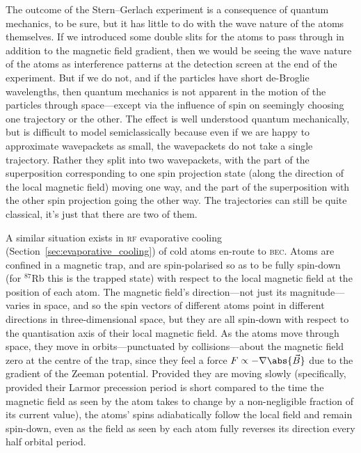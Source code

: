 The outcome of the Stern--Gerlach experiment is a consequence of quantum mechanics, to be sure, but it has little to do with the wave nature of the atoms themselves. If we introduced some double slits for the atoms to pass through in addition to the magnetic field gradient, then we would be seeing the wave nature of the atoms as interference patterns at the detection screen at the end of the experiment. But if we do not, and if the particles have short de-Broglie wavelengths, then quantum mechanics is not apparent in the motion of the particles through space---except via the influence of spin on seemingly choosing one trajectory or the other. The effect is well understood quantum mechanically, but is difficult to model semiclassically because even if we are happy to approximate wavepackets as small, the wavepackets do not take a single trajectory. Rather they split into two wavepackets, with the part of the superposition corresponding to one spin projection state (along the direction of the local magnetic field) moving one way, and the part of the superposition with the other spin projection going the other way. The trajectories can still be quite classical, it's just that there are two of them.

A similar situation exists in \textsc{rf} evaporative cooling (Section~\ref{sec:evaporative_cooling}) of cold atoms en-route to \textsc{bec}. Atoms are confined in a magnetic trap, and are spin-polarised so as to be fully spin-down (for $^{87}$Rb this is the trapped state) with respect to the local magnetic field at the position of each atom. The magnetic field's direction---not just  its magnitude---varies in space, and so the spin vectors of different atoms point in different directions in three-dimensional space, but they are all spin-down with respect to the quantisation axis of their local magnetic field. As the atoms move through space, they move in orbits---punctuated by collisions---about the magnetic field zero at the centre of the trap, since they feel a force $F\propto-\nabla\abs{\vec B}$ due to the gradient of the Zeeman potential. Provided they are moving slowly (specifically, provided their Larmor precession period is short compared to the time the magnetic field as seen by the atom takes to change by a non-negligible fraction of its current value), the atoms' spins adiabatically follow the local field and remain spin-down, even as the field as seen by each atom fully reverses its direction every half orbital period.


